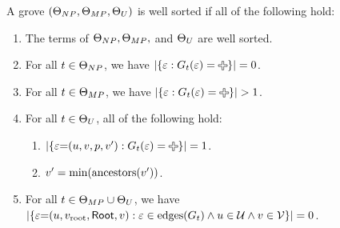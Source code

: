 \begin{definition}
  A grove $(\Set[NP], \Set[MP], \Set[U])$ is well sorted if all of the following hold:
  \begin{enumerate}
    \item The terms of $\Set[NP], \Set[MP],$ and $\Set[U]$ are well sorted.
    \item For all $t \in \Set[NP]$,
      we have $\SizeOf{\SetOf{\e \SuchThat{G_t(\e) = \Plus}}} = 0$.
    \item For all $t \in \Set[MP]$,
      we have $\SizeOf{\SetOf{\e \SuchThat{G_t(\e) = \Plus}}} > 1$.
    \item For all $t \in \Set[U]$, all of the following hold:
      \begin{enumerate}
        \item $\SizeOf{\SetOf{\e{=}(u, v, p, v') \SuchThat{G_t(\e) = \Plus}}} = 1$.
        \item $v' = \min{\ancestors{v'}}$.
      \end{enumerate}
    \item For all $t \in \Set[MP] \cup \Set[U]$,
      we have $\SizeOf{\SetOf{\e{=}(u, \rootVertex, \Root, v) \SuchThat{\e \in \edges{G_t} \land u \in \U \land v \in \V}}} = 0$.
  \end{enumerate}
\end{definition}

